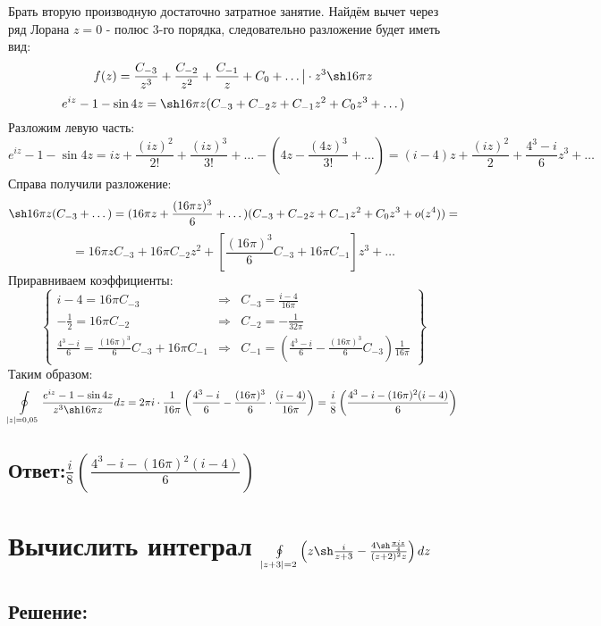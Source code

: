 \documentclass{article}
\begin{document}
	Брать вторую производную достаточно затратное занятие. Найдём вычет через ряд Лорана
	$z=0$ - полюс 3-го порядка, следовательно разложение будет иметь вид:
	\[f(z) = \frac{C_{-3}}{z^3} + \frac{C_{-2}}{z^2} + \frac{C_{-1}}{z} + C_0 + \dots \big| \cdot z^3\sh16\pi z\]
	\[e^{iz} -1 -\sin4z = \sh 16 \pi z (C_{-3} + C_{-2}z + C_{-1}z^2 + C_{0}z^3 + \dots)\]
	Разложим левую часть:
	\[e^{iz} -1 -\sin4z = iz + \frac{(iz)^2}{2!} + \frac{(iz)^3}{3!} + \dots - (4z - \frac{(4z)^3}{3!} + \dots) = (i-4)z + \frac{(iz)^2}{2} + \frac{4^3 - i}{6}z^3 + \dots\]
	Справа получили разложение:
	\[\sh16\pi z (C_{-3} +\dots) = (16\pi z + \frac{(16\pi z)^3}{6} + \dots)(C_{-3} + C_{-2}z + C_{-1}z^2 + C_{0}z^3 + o(z^4)) = \]
	\[=16\pi z C_{-3} + 16 \pi C_{-2}z^2 + \left[\frac{(16\pi)^3}{6}C_{-3} + 16\pi C_{-1}\right]z^3 + \dots\]
	Приравниваем коэффициенты:
	\[\begin{Bmatrix}
		i-4 = 16\pi C_{-3} & \Rightarrow &C_{-3} =  \frac{i-4}{16\pi} \\
		-\frac{1}{2} = 16\pi C_{-2} & \Rightarrow & C_{-2} = -\frac{1}{32\pi}\\
		\frac{4^3-i}{6} = \frac{(16\pi)^3}{6}C_{-3} + 16\pi C_{-1} & \Rightarrow & C_{-1} = \left(\frac{4^3 - i}{6} - \frac{(16\pi)^3}{6}C_{-3}\right)\frac{1}{16\pi}
		
	\end{Bmatrix}\]
	Таким образом:
	\[\oint\limits_{|z|=0,05} \frac{e^{iz} - 1 -\sin 4z}{z^3 \sh 16 \pi z}dz = 2\pi i \cdot \frac{1}{16\pi}\left(\frac{4^3-i}{6} - \frac{(16\pi)^3}{6}\cdot\frac{(i-4)}{16\pi}\right) = \frac{i}{8}\left(\frac{4^3-i - (16\pi)^2(i-4)}{6}\right)\]
	\subsection{Ответ:$\frac{i}{8}\left(\frac{4^3-i - (16\pi)^2(i-4)}{6}\right)$}
	
	\newpage
	\section{Вычислить интеграл $\oint\limits_{|z+3|=2}\left(z \sh \frac{i}{z+3} - \frac{4 \sh \frac{\pi i z}{4}}{(z+2)^2z}\right) dz$}
	\subsection{Решение:}
	
\end{document}
